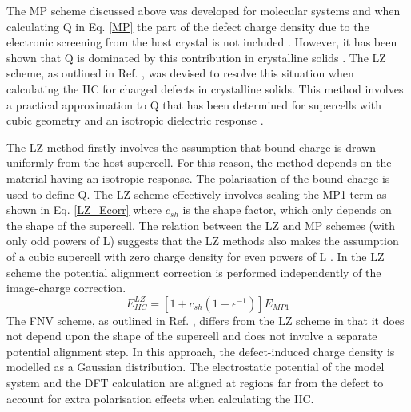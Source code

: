 \documentclass[11pt, twoside]{report}
\begin{document}

The MP scheme \cite{MP} discussed above was developed for molecular systems and when calculating Q in Eq. \ref{MP} the part of the defect charge density due to the electronic screening from the host crystal is not included \cite{Lany_defects_2008, Lany_defects}. However, it has been shown that Q is dominated by this contribution in crystalline solids \cite{Lany_defects_2008}. The LZ scheme, as outlined in Ref. , was devised to resolve this situation when calculating the IIC for charged defects in crystalline solids.
This method involves a practical approximation to Q that has been determined for supercells with cubic geometry and an isotropic dielectric response \cite{Durrant_defects}.

The LZ method firstly involves the assumption that bound charge is drawn uniformly from the host supercell. For this reason, the method depends on the material having an isotropic response. The polarisation of the bound charge is used to define Q. The LZ scheme effectively involves scaling the MP1 term as shown in Eq. \ref{LZ_Ecorr} where $c_{sh}$ is the shape factor, which only depends on the shape of the supercell. The relation between the LZ and MP schemes (with only odd powers of L) suggests that the LZ methods also makes the assumption of a cubic supercell with zero charge density for even powers of L \cite{Durrant_defects}. In the LZ scheme the potential alignment correction is performed independently of the image-charge correction.
\begin{equation}\label{LZ_Ecorr}
E_{IIC}^{LZ} = [1 + c_{sh} (1 - \epsilon^{-1}) ] E_{MP1}
\end{equation}
The FNV scheme, as outlined in Ref. , differs from the LZ scheme in that it does not depend upon the shape of the supercell and does not involve a separate potential alignment step. In this approach, the defect-induced charge density is modelled as a Gaussian distribution. The electrostatic potential of the model system and the DFT calculation are aligned at regions far from the defect to account for extra polarisation effects when calculating the IIC.
\end{document}
